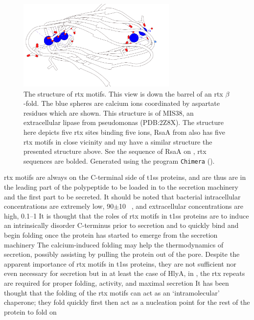   \begin{figure}[htb]
    \begin{center}
      \includegraphics[width=0.7\textwidth]{intro/img/rtx-white.png}
    \end{center}
    \caption[The structure of \ac{rtx} motifs]{The structure of \ac{rtx} motifs. This view is down the barrel of an \ac{rtx} $\beta$-fold. The blue spheres are calcium ions coordinated by aspartate residues which are shown. This structure is of MIS38, an extracellular lipase from \ac{pseudomonas} (PDB:2Z8X). The structure here depicts five \ac{rtx} sites binding five  ions, RsaA from \caulobacter also has five \ac{rtx} motifs in close vicinity and my have a similar structure the presented structure above. See the sequence of RsaA on , \ac{rtx} sequences are bolded. Generated using the program \texttt{Chimera} ().
    }
    \label{fig:intro-rtx}
  \end{figure}   

  \ac{rtx} motifs are always on the C-terminal side of \ac{t1ss} proteins, and are thus are in the leading part of the polypeptide to be loaded in to the secretion machinery and the first part to be secreted. It should be noted that bacterial intracellular  concentrations are extremely low, 90$\pm$10 \si{\nano\molar}, and extracellular  concentrations are high, 0.1--1 \millimolar{} It is thought that the roles of \ac{rtx} motifs in \ac{t1ss} proteins are to induce an intrinsically disorder C-terminus prior to secretion and to quickly  bind  and begin folding once the protein has started to emerge from the secretion machinery The calcium-induced folding may help the thermodynamics of secretion, possibly assisting by pulling the protein out of the pore.  Despite the apparent importance of \ac{rtx} motifs in \ac{t1ss} proteins, they are not sufficient nor even necessary for secretion but in at least the case of HlyA, in \ecoli, the \ac{rtx} repeats are required for proper folding, activity, and maximal secretion It has been thought that the folding of the \ac{rtx} motifs can act as an `intramolecular' chaperone; they fold quickly first then act as a nucleation point for the rest of the protein to fold on 
 
